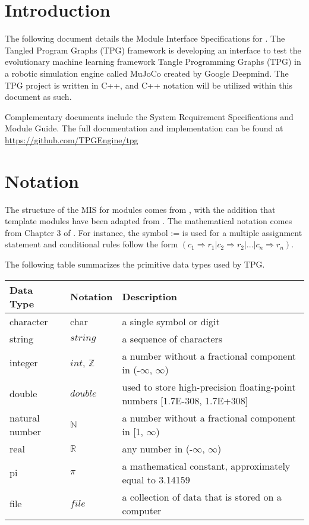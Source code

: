 \documentclass[12pt, titlepage]{article}
\begin{document}
\newpage

\tableofcontents

\newpage


\section{Introduction}

The following document details the Module Interface Specifications for
\progname{}. The Tangled Program Graphs (TPG) framework is developing an interface to test the evolutionary machine learning framework Tangle Programming Graphs (TPG) in a robotic simulation engine called MuJoCo created by Google Deepmind.
The TPG project is written in C++, and C++ notation will be utilized within this document as such.



Complementary documents include the System Requirement Specifications
and Module Guide.  The full documentation and implementation can be
found at \url{https://github.com/TPGEngine/tpg} 

\section{Notation}
The structure of the MIS for modules comes from \citet{HoffmanAndStrooper1995},
with the addition that template modules have been adapted from
\cite{GhezziEtAl2003}.  The mathematical notation comes from Chapter 3 of
\citet{HoffmanAndStrooper1995}.  For instance, the symbol := is used for a
multiple assignment statement and conditional rules follow the form $(c_1
\Rightarrow r_1 | c_2 \Rightarrow r_2 | ... | c_n \Rightarrow r_n )$.

The following table summarizes the primitive data types used by TPG. 

\begin{center}
\renewcommand{\arraystretch}{1.2}
\noindent 
\begin{tabular}{l l p{7.5cm}} 
\toprule 
\textbf{Data Type} & \textbf{Notation} & \textbf{Description}\\ 
\midrule
character & char & a single symbol or digit\\
string & $string$ & a sequence of characters \\
integer & $int$, $\mathbb{Z}$ & a number without a fractional component in (-$\infty$, $\infty$) \\
double & $double$ & used to store high-precision floating-point numbers [1.7E-308, 1.7E+308] \\
natural number & $\mathbb{N}$ & a number without a fractional component in [1, $\infty$) \\
real & $\mathbb{R}$ & any number in (-$\infty$, $\infty$)\\
pi & $\pi$ & a mathematical constant, approximately equal to 3.14159 \\
file & $file$ & a collection of data that is stored on a computer\\
\bottomrule
\end{tabular} 
\end{center}
\end{document}
